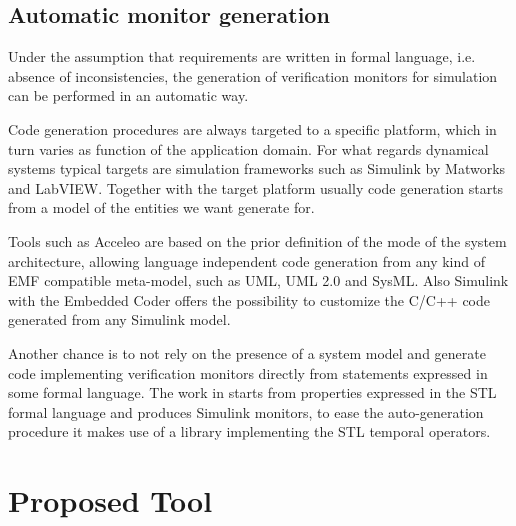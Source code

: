 \subsection{Automatic monitor generation}
Under the assumption that requirements are written in formal language, i.e. absence of inconsistencies, the generation of verification monitors for simulation can be performed in an automatic way. 
\par Code generation procedures are always targeted to a specific platform, which in turn varies as function of the application domain. For what regards dynamical systems typical targets are simulation frameworks such as Simulink by Matworks\citep{Simulink} and LabVIEW\citep{Labview}. Together with the target platform usually code generation starts from a model of the entities we want generate for. 
\par Tools such as Acceleo\citep{acceleo} are based on the prior definition of the mode of the system architecture, allowing language independent code generation from any kind of EMF compatible meta-model, such as UML, UML 2.0 and SysML. Also Simulink with the Embedded Coder offers the possibility to customize the C/C++ code generated from any Simulink model.
\par Another chance is to not rely on the presence of a system model and generate code implementing verification monitors directly from statements expressed in some formal language. The work in \citep{bals2017} starts from properties expressed in the STL formal language\citep{maler2008checking} and produces Simulink monitors, to ease the auto-generation procedure it makes use of a library implementing the STL temporal operators.

\section{Proposed Tool}

